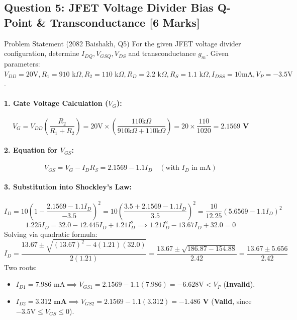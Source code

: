 \documentclass[11pt,a4paper,oneside]{book}
\begin{document}
\subsection{Question 5: JFET Voltage Divider Bias Q-Point \& Transconductance [6 Marks]}
\begin{questionbox}{Problem Statement (2082 Baishakh, Q5)}
For the given JFET voltage divider configuration, determine $I_{DQ}, V_{GSQ}, V_{DS}$ and transconductance $g_m$.
Given parameters: $V_{DD} = 20\text{V}, R_1 = 910\text{ k}\Omega, R_2 = 110\text{ k}\Omega, R_D = 2.2\text{ k}\Omega, R_S = 1.1\text{ k}\Omega, I_{DSS} = 10\text{mA}, V_P = -3.5\text{V}$.
\end{questionbox}

\paragraph{1. Gate Voltage Calculation ($V_G$):}
\[
V_G = V_{DD} \left(\frac{R_2}{R_1 + R_2}\right) = 20\text{V} \times \left(\frac{110\text{k}\Omega}{910\text{k}\Omega + 110\text{k}\Omega}\right) = 20 \times \frac{110}{1020} = \mathbf{2.1569\text{ V}}
\]

\paragraph{2. Equation for $V_{GS}$:}
\[
V_{GS} = V_G - I_D R_S = 2.1569 - 1.1 I_D \quad (\text{with } I_D \text{ in mA})
\]

\paragraph{3. Substitution into Shockley's Law:}
\[
I_D = 10 \left(1 - \frac{2.1569 - 1.1 I_D}{-3.5}\right)^2 = 10 \left(\frac{3.5 + 2.1569 - 1.1 I_D}{3.5}\right)^2 = \frac{10}{12.25} (5.6569 - 1.1 I_D)^2
\]
\[
1.225 I_D = 32.0 - 12.445 I_D + 1.21 I_D^2 \implies 1.21 I_D^2 - 13.67 I_D + 32.0 = 0
\]
Solving via quadratic formula:
\[
I_D = \frac{13.67 \pm \sqrt{(13.67)^2 - 4(1.21)(32.0)}}{2(1.21)} = \frac{13.67 \pm \sqrt{186.87 - 154.88}}{2.42} = \frac{13.67 \pm 5.656}{2.42}
\]
Two roots:
\begin{itemize}[leftmargin=1.5em]
  \item $I_{D1} = 7.986\text{ mA} \implies V_{GS1} = 2.1569 - 1.1(7.986) = -6.628\text{V} < V_P$ (\textbf{Invalid}).
  \item $I_{D2} = \mathbf{3.312\text{ mA}} \implies V_{GS2} = 2.1569 - 1.1(3.312) = \mathbf{-1.486\text{ V}}$ (\textbf{Valid}, since $-3.5\text{V} \le V_{GS} \le 0$).
\end{itemize}
\end{document}
